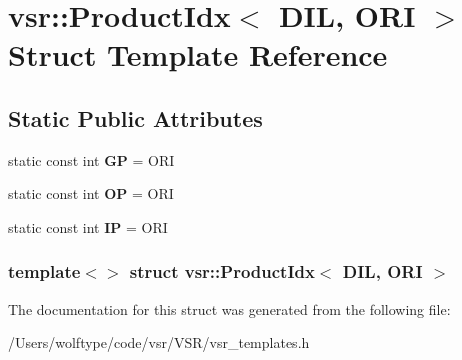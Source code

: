 \hypertarget{structvsr_1_1_product_idx_3_01_d_i_l_00_01_o_r_i_01_4}{\section{vsr\-:\-:Product\-Idx$<$ D\-I\-L, O\-R\-I $>$ Struct Template Reference}
\label{structvsr_1_1_product_idx_3_01_d_i_l_00_01_o_r_i_01_4}
}
\subsection*{Static Public Attributes}
\begin{DoxyCompactItemize}
\item 
\hypertarget{structvsr_1_1_product_idx_3_01_d_i_l_00_01_o_r_i_01_4_a45e2e4cf4533d2a6bd248d1a413a189b}{static const int {\bfseries G\-P} = O\-R\-I}\label{structvsr_1_1_product_idx_3_01_d_i_l_00_01_o_r_i_01_4_a45e2e4cf4533d2a6bd248d1a413a189b}

\item 
\hypertarget{structvsr_1_1_product_idx_3_01_d_i_l_00_01_o_r_i_01_4_a0c359873488e88fb19bce2442c47f014}{static const int {\bfseries O\-P} = O\-R\-I}\label{structvsr_1_1_product_idx_3_01_d_i_l_00_01_o_r_i_01_4_a0c359873488e88fb19bce2442c47f014}

\item 
\hypertarget{structvsr_1_1_product_idx_3_01_d_i_l_00_01_o_r_i_01_4_a2b1c8788646b1468b270839d925788e3}{static const int {\bfseries I\-P} = O\-R\-I}\label{structvsr_1_1_product_idx_3_01_d_i_l_00_01_o_r_i_01_4_a2b1c8788646b1468b270839d925788e3}

\end{DoxyCompactItemize}
\subsubsection*{template$<$$>$ struct vsr\-::\-Product\-Idx$<$ D\-I\-L, O\-R\-I $>$}



The documentation for this struct was generated from the following file\-:\begin{DoxyCompactItemize}
\item 
/\-Users/wolftype/code/vsr/\-V\-S\-R/vsr\-\_\-templates.\-h\end{DoxyCompactItemize}
